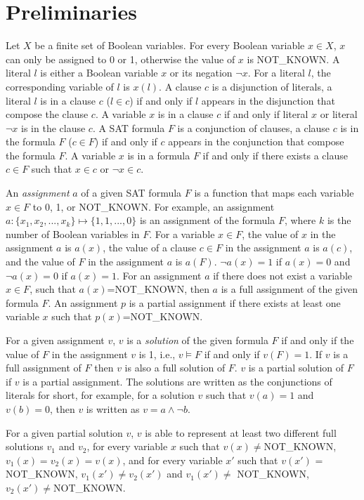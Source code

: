 \section{Preliminaries} \label{sec:prel}
Let $X$ be a finite set of Boolean variables. For every Boolean variable $x\in X$, $x$ can only be assigned to 0 or 1, otherwise the value of $x$ is NOT\_KNOWN.
A literal $l$ is either a Boolean variable $x$ or its negation $\neg x$. For a literal $l$, the corresponding variable of $l$ is $x(l)$.
A clause $c$ is a disjunction of literals, a literal $l$ is in a clause $c$ ($l\in c$) if and only if $l$ appears in the disjunction that compose the clause $c$. A variable $x$ is in a clause $c$ if and only if literal $x$ or literal $\neg x$ is in the clause $c$.
A SAT formula $F$ is a conjunction of clauses, a clause $c$ is in the formula $F$ ($c\in F$) if and only if $c$ appears in the conjunction that compose the formula $F$. A variable $x$ is in a formula $F$ if and only if there exists a clause $c\in F$ such that $x\in c$ or $\neg x\in c$. 

An \emph{assignment} $a$ of a given SAT formula $F$ is a function that maps each variable $x\in F$ to 0, 1, or NOT\_KNOWN. 
For example, an assignment $a: \{x_1, x_2, ..., x_k\} \mapsto \{1, 1, ..., 0\}$ is an assignment of the formula $F$, where $k$ is the number of Boolean variables in $F$. 
For a variable $x\in F$, the value of $x$ in the assignment $a$ is $a(x)$, the value of a clause $c\in F$ in the assignment $a$ is $a(c)$, and the value of $F$ in the assignment $a$ is $a(F)$.
$\neg a(x)=1$ if $a(x)=0$ and $\neg a(x)=0$ if $a(x)=1$.
For an assignment $a$ if there does not exist a variable $x\in F$, such that $a(x)$=NOT\_KNOWN, then $a$ is a full assignment of the given formula $F$. 
An assignment $p$ is a partial assignment if there exists at least one variable $x$ such that $p(x)$=NOT\_KNOWN.

For a given assignment $v$, $v$ is a \emph{solution} of the given formula $F$ if and only if the value of $F$ in the assignment $v$ is 1, i.e., $v\models F$ if and only if $v(F)=1$. If $v$ is a full assignment of $F$ then $v$ is also a full solution of $F$. $v$ is a partial solution of $F$ if $v$ is a partial assignment.
The solutions are written as the conjunctions of literals for short, for example, for a solution $v$ such that $v(a)=1$ and $v(b)=0$, then $v$ is written as $v=a\wedge \neg b$.

For a given partial solution $v$, $v$ is able to represent at least two different full solutions $v_1$ and $v_2$, for every variable $x$ such that $v(x) \neq $NOT\_KNOWN, $v_1(x) = v_2(x) = v(x)$, and for every variable $x'$ such that $v(x')$ = NOT\_KNOWN, $v_1(x') \neq v_2(x')$ and $v_1(x') \neq $ NOT\_KNOWN, $v_2(x') \neq $NOT\_KNOWN.

